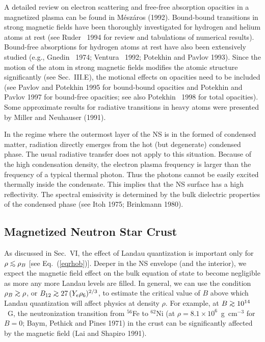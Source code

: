 A detailed review on electron scattering and free-free absorption
opacities in a magnetized plasma can be found in M\'esz\'aros (1992).
Bound-bound transitions in strong magnetic fields have been 
thoroughly investigated for hydrogen and helium atoms at rest
(see Ruder \etal~1994 for review and tabulations of numerical results).
Bound-free absorptions for hydrogen atoms at rest have also been
extensively studied (e.g., Gnedin \etal~1974; Ventura \etal~1992; Potekhin 
and Pavlov 1993). Since the motion of the atom in strong
magnetic fields modifies the atomic structure significantly (see Sec.~III.E),
the motional effects on opacities need to be included (see
Pavlov and Potekhin 1995 for bound-bound opacities and
Potekhin and Pavlov 1997 for bound-free opacities; see also
Potekhin \etal~1998 for total opacities). 
Some approximate results for radiative transitions in 
heavy atoms were presented by Miller and Neuhauser (1991). 

In the regime where the outermost layer of the NS is in the formed
of condensed matter, radiation directly emerges from the hot (but degenerate)
condensed phase. The usual radiative transfer does not apply to this
situation. Because of the high condensation density, the electron plasma
frequency is larger than the frequency of a typical thermal photon. Thus
the photons cannot be easily excited thermally inside 
the condensate. This implies that the NS surface has a high reflectivity. 
The spectral emissivity is determined by the bulk dielectric properties
of the condensed phase (see Itoh 1975; Brinkmann 1980).


\subsection{Magnetized Neutron Star Crust}

As discussed in Sec.~VI, the effect of 
Landau quantization is important only for 
$\rho\lo \rho_B$ [see Eq.~(\ref{eqrhob})]. Deeper in the NS
envelope (and the interior), we expect the magnetic field effect on the bulk
equation of state to become negligible as more any more Landau levels are
filled. In general, we can use the condition $\rho_B\go \rho$, or $B_{12}\go
27\,(Y_e\rho_6)^{2/3}$, to estimate the critical value of $B$ above which
Landau quantization will affect physics at density $\rho$. For example, 
at $B\go 10^{14}$~G, the neutronization transition from $^{56}$Fe 
to $^{62}$Ni (at $\rho=8.1\times 10^{6}$~g~cm$^{-3}$ for $B=0$; Baym, Pethick
and Pines 1971) in the crust can be significantly affected by the magnetic 
field (Lai and Shapiro 1991).

